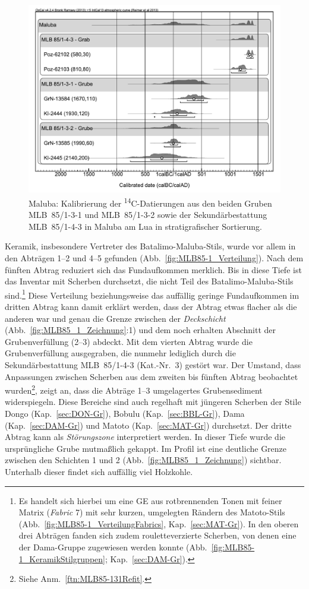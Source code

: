 \begin{figure}[!tb]
	\centering
	\includegraphics[width = .75\textwidth]{fig/MLB85_14C.pdf}
	\caption{Maluba: Kalibrierung der \textsuperscript{14}C-Datierungen aus den beiden Gruben MLB~85/1-3-1 und MLB~85/1-3-2 sowie der Sekundärbestattung MLB~85/1-4-3 in Maluba am Lua in stratigrafischer Sortierung.}
	\label{fig:MLB85_1_14C-Kalibration}
\end{figure}

Keramik, insbesondere Vertreter des Batalimo-Maluba-Stils, wurde vor allem in den Abträgen 1--2 und 4--5 gefunden (Abb.~\ref{fig:MLB85-1_Verteilung}). Nach dem fünften Abtrag reduziert sich das Fundaufkommen merklich. Bis in diese Tiefe ist das Inventar mit Scherben durchsetzt, die nicht Teil des Batalimo-Maluba-Stils sind.\footnote{Es handelt sich hierbei um eine GE aus rotbrennenden Tonen mit feiner Matrix (\textit{Fabric} 7) mit sehr kurzen, umgelegten Rändern des Matoto-Stils (Abb.~\ref{fig:MLB85-1_VerteilungFabrics}, Kap.~\ref{sec:MAT-Gr}). In den oberen drei Abträgen fanden sich zudem rouletteverzierte Scherben, von denen eine der Dama-Gruppe zugewiesen werden konnte (Abb.~\ref{fig:MLB85-1_KeramikStilgruppen}; Kap.~\ref{sec:DAM-Gr}).} Diese Verteilung beziehungsweise das auffällig geringe Fundaufkommen im dritten Abtrag kann damit erklärt werden, dass der Abtrag etwas flacher als die anderen war und genau die Grenze zwischen der \textit{Deckschicht} (Abb.~\ref{fig:MLB85_1_Zeichnung}:1) und dem noch erhalten Abschnitt der Grubenverfüllung (2--3) abdeckt. Mit dem vierten Abtrag wurde die Grubenverfüllung ausgegraben, die nunmehr lediglich durch die Sekundärbestattung MLB~85/1-4-3 (Kat.-Nr.~3) gestört war. Der Umstand, dass Anpassungen zwischen Scherben aus dem zweiten bis fünften Abtrag beobachtet wurden\footnote{Siehe Anm.~\ref{ftn:MLB85-131Refit}.}, zeigt an, dass die Abträge 1--3 umgelagertes Grubensediment widerspiegeln. Diese Bereiche sind auch regelhaft mit jüngeren Scherben der Stile Dongo (Kap.~\ref{sec:DON-Gr}), Bobulu (Kap.~\ref{sec:BBL-Gr}), Dama (Kap.~\ref{sec:DAM-Gr}) und Matoto (Kap.~\ref{sec:MAT-Gr}) durchsetzt. Der dritte Abtrag kann als \textit{Störungszone} interpretiert werden. In dieser Tiefe wurde die ursprüngliche Grube mutmaßlich gekappt. Im Profil ist eine deutliche Grenze zwischen den Schichten 1 und 2 (Abb.~\ref{fig:MLB85_1_Zeichnung}) sichtbar. Unterhalb dieser findet sich auffällig viel Holzkohle. 

